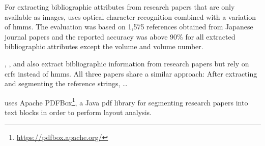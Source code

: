 For extracting bibliographic attributes from research papers that are only available as images, \citet{takasu2003bibliographic} uses optical character recognition combined with a variation of \glspl{hmm}. The evaluation was based on 1,575 references obtained from Japanese journal papers and the reported accuracy was above 90\% for all extracted bibliographic attributes except the volume and volume number.

\cite{peng2004accurate}, \cite{councill2008parscit}, and \cite{groza2012reference} also extract bibliographic information from research papers but rely on \glspl{crf} instead of \glspl{hmm}. All three papers share a similar approach: After extracting and segmenting the reference strings, \dots




\citet{marinai2009metadata} uses Apache PDFBox\footnote{\url{https://pdfbox.apache.org/}}, a Java \gls{pdf} library for segmenting research papers into text blocks in order to perform layout analysis.
